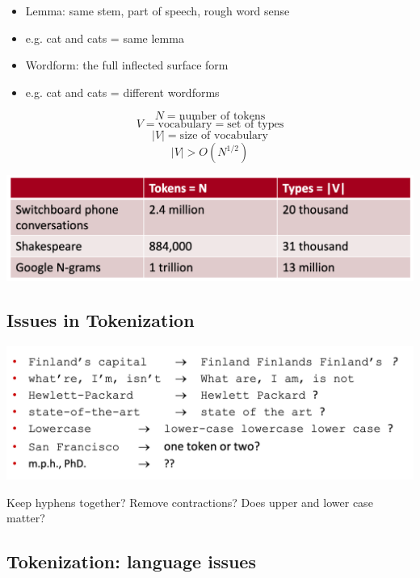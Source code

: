 \documentclass[11pt]{article}
\theoremstyle{definition}
\begin{document}
\begin{itemize}
  \item Lemma: same stem, part of speech, rough word sense
  \item e.g. cat and cats = same lemma
  \item Wordform: the full inflected surface form
  \item e.g. cat and cats = different wordforms
\end{itemize}

\begin{equation}
  N = \text{number of tokens} 
\end{equation}
\begin{equation}
  V = \text{vocabulary} = \text{set of types} 
\end{equation}
\begin{equation}
  |V| = \text{size of vocabulary}
\end{equation}
\begin{equation}
  |V| > O(N^{1/2})
\end{equation}

\includegraphics[width=\textwidth]{1.png}

\subsection{Issues in Tokenization}

\includegraphics[width=\textwidth]{2.png}

Keep hyphens together? Remove contractions? Does upper and lower case matter?

\subsection{Tokenization: language issues}
\end{document}
